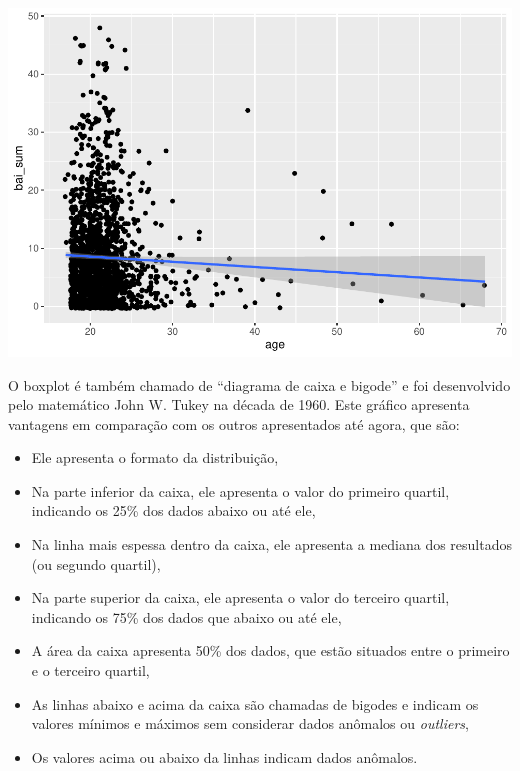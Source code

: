 \documentclass[
]{book}
\providecommand{\tightlist}{%
  \setlength{\itemsep}{0pt}\setlength{\parskip}{0pt}}
\begin{document}
\begin{center}\includegraphics{gitbook-demo_files/figure-latex/unnamed-chunk-24-1} \end{center}

O boxplot é também chamado de ``diagrama de caixa e bigode'' e foi desenvolvido pelo matemático John W. Tukey na década de 1960. Este gráfico apresenta vantagens em comparação com os outros apresentados até agora, que são:

\begin{itemize}
\tightlist
\item
  Ele apresenta o formato da distribuição,\\
\item
  Na parte inferior da caixa, ele apresenta o valor do primeiro quartil, indicando os 25\% dos dados abaixo ou até ele,\\
\item
  Na linha mais espessa dentro da caixa, ele apresenta a mediana dos resultados (ou segundo quartil),\\
\item
  Na parte superior da caixa, ele apresenta o valor do terceiro quartil, indicando os 75\% dos dados que abaixo ou até ele,\\
\item
  A área da caixa apresenta 50\% dos dados, que estão situados entre o primeiro e o terceiro quartil,\\
\item
  As linhas abaixo e acima da caixa são chamadas de bigodes e indicam os valores mínimos e máximos sem considerar dados anômalos ou \emph{outliers},\\
\item
  Os valores acima ou abaixo da linhas indicam dados anômalos.
\end{itemize}
\end{document}
